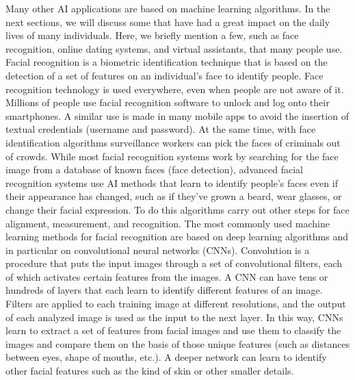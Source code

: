Many other AI applications are based on machine learning algorithms. In the next sections, we will discuss some that have had a great impact on the daily lives of many individuals. Here, we briefly mention a few, such as face recognition, online dating systems, and virtual assistants, that many people use. Facial recognition is a biometric identification technique that is based on the detection of a set of features on an individual's face to identify people. Face recognition technology is used everywhere, even when people are not aware of it. Millions of people use facial recognition software to unlock and log onto their smartphones. A similar use is made in many mobile apps to avoid the insertion of textual credentials (username and password). At the same time, with face identification algorithms surveillance workers can pick the faces of criminals out of crowds. While most facial recognition systems work by searching for the face image from a database of known faces (face detection), advanced facial recognition systems use AI methods that learn to identify people's faces even if their appearance has changed, such as if they've grown a beard, wear glasses, or change their facial expression. To do this algorithms carry out other steps for face alignment, measurement, and recognition. The most commonly used machine learning methods for facial recognition are based on deep learning algorithms and in particular on convolutional neural networks (CNNs). Convolution is a procedure that puts the input images through a set of convolutional filters, each of which activates certain features from the images. A CNN can have tens or hundreds of layers that each learn to identify different features of an image. Filters are applied to each training image at different resolutions, and the output of each analyzed image is used as the input to the next layer. In this way, CNNs learn to extract a set of features from facial images and use them to classify the images and compare them on the basis of those unique features (such as distances between eyes, shape of mouths, etc.). A deeper network can learn to identify other facial features such as the kind of skin or other smaller details.

